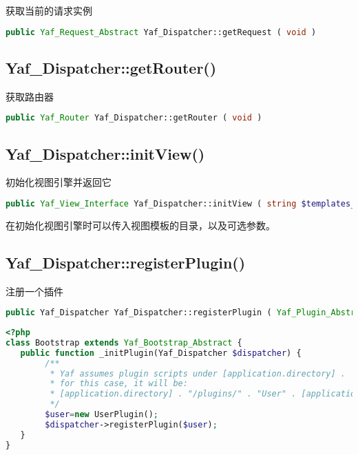 获取当前的请求实例

\begin{lstlisting}[language=PHP]
public Yaf_Request_Abstract Yaf_Dispatcher::getRequest ( void )
\end{lstlisting}





\subsection{Yaf\_Dispatcher::getRouter()}

获取路由器


\begin{lstlisting}[language=PHP]
public Yaf_Router Yaf_Dispatcher::getRouter ( void )
\end{lstlisting}





\subsection{Yaf\_Dispatcher::initView()}

初始化视图引擎并返回它


\begin{lstlisting}[language=PHP]
public Yaf_View_Interface Yaf_Dispatcher::initView ( string $templates_dir [, array $options ] )
\end{lstlisting}

在初始化视图引擎时可以传入视图模板的目录，以及可选参数。



\subsection{Yaf\_Dispatcher::registerPlugin()}


注册一个插件


\begin{lstlisting}[language=PHP]
public Yaf_Dispatcher Yaf_Dispatcher::registerPlugin ( Yaf_Plugin_Abstract $plugin )
\end{lstlisting}


\begin{lstlisting}[language=PHP]
<?php
class Bootstrap extends Yaf_Bootstrap_Abstract {
   public function _initPlugin(Yaf_Dispatcher $dispatcher) {
        /**
         * Yaf assumes plugin scripts under [application.directory] .  "/plugins" 
         * for this case, it will be:
         * [application.directory] . "/plugins/" . "User" . [application.ext]
         */ 
        $user=new UserPlugin();
        $dispatcher->registerPlugin($user);
   }
}
\end{lstlisting}

